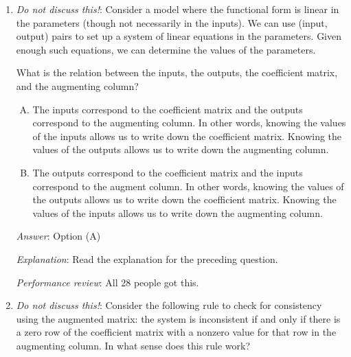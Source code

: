 \documentclass[10pt]{amsart}
\begin{document}
\begin{enumerate}
  {\em Answer}: Option (B)

  {\em Explanation}: Each (input, output) pair gives an
  equation. Since the functional form is linear in the parameters, the
  equation is a linear equation. Each equation corresponds to a row of
  the augmented matrix (the input part affects the left side of the
  equation, and hence the coefficient matrix row, while the output
  part is the constant on the right side of the equation, i.e., the
  augmenting value).

  The parameters are the variables that we are trying to solve
  for. These thus correspond to the columns.

  {\em Performance review}: 26 out of 28 got this. 2 chose (A).

\item {\em Do not discuss this!}: Consider a model where the
  functional form is linear in the parameters (though not necessarily
  in the inputs). We can use (input, output) pairs to set up a system
  of linear equations in the parameters. Given enough such equations,
  we can determine the values of the parameters.

  What is the relation between the inputs, the outputs, the
  coefficient matrix, and the augmenting column?

  \begin{enumerate}[(A)]
  \item The inputs correspond to the coefficient matrix and the
    outputs correspond to the augmenting column. In other words,
    knowing the values of the inputs allows us to write down the
    coefficient matrix. Knowing the values of the outputs allows us to
    write down the augmenting column.
  \item The outputs correspond to the coefficient matrix and the
    inputs correspond to the augment column. In other words, knowing
    the values of the outputs allows us to write down the coefficient
    matrix. Knowing the values of the inputs allows us to write down
    the augmenting column.
  \end{enumerate}

  {\em Answer}: Option (A)

  {\em Explanation}: Read the explanation for the preceding question.

  {\em Performance review}: All 28 people got this.

\item {\em Do not discuss this!}: Consider the following rule to check
  for consistency using the augmented matrix: the system is
  inconsistent if and only if there is a zero row of the coefficient
  matrix with a nonzero value for that row in the augmenting
  column. In what sense does this rule work?


\end{enumerate}
\end{document}
